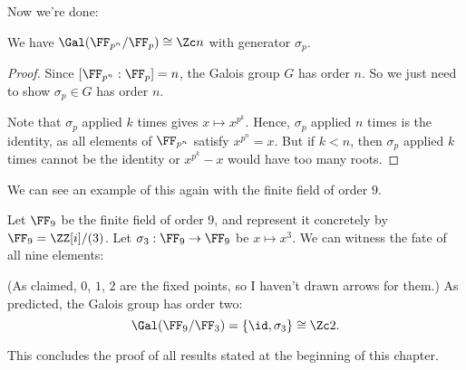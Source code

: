 Now we're done:
\begin{theorem}
	We have $\Gal(\FF_{p^n}/\FF_p) \cong \Zc n$ with generator $\sigma_p$.
\end{theorem}
\begin{proof}
	Since $[\FF_{p^n}:\FF_p] = n$, the Galois group $G$ has order $n$.
	So we just need to show $\sigma_p \in G$ has order $n$.

	Note that $\sigma_p$ applied $k$ times gives $x \mapsto x^{p^k}$.
	Hence, $\sigma_p$ applied $n$ times is the identity,
	as all elements of $\FF_{p^n}$ satisfy $x^{p^n}=x$.
	But if $k < n$, then $\sigma_p$ applied $k$ times
	cannot be the identity or $x^{p^k}-x$ would have too many roots.
\end{proof}

We can see an example of this again with the finite field of order $9$.
\begin{example}
	Let $\FF_9$ be the finite field of order $9$,
	and represent it concretely by $\FF_9 = \ZZ[i]/(3)$.
	Let $\sigma_3 : \FF_9 \to \FF_9$ be $x \mapsto x^3$.
	We can witness the fate of all nine elements:
	\begin{center}
	\end{center}
	(As claimed, $0$, $1$, $2$ are the fixed points,
	so I haven't drawn arrows for them.)
	As predicted, the Galois group has order two:
	\[ \Gal(\FF_9/\FF_3) = \left\{ \id, \sigma_3 \right\} \cong \Zc 2. \]
\end{example}

This concludes the proof of all results stated at the beginning of this chapter.

